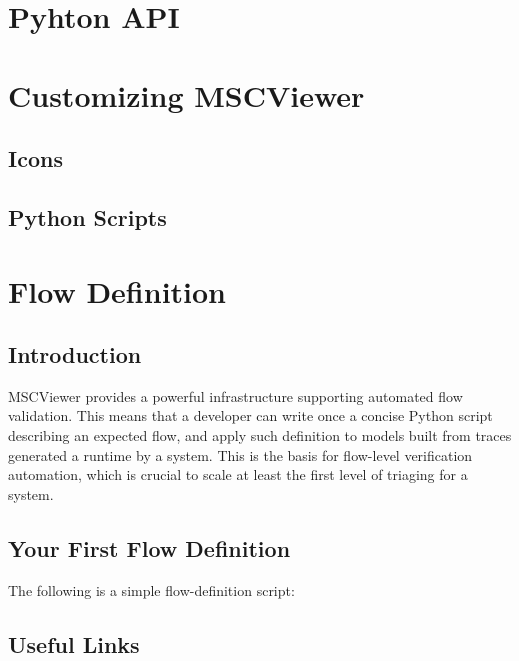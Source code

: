 \documentclass[11pt, twoside, titlepage]{book}
\newcommand{\prog}{MSCViewer}
\begin{document}
\chapter{Pyhton API}



\chapter{Customizing \prog}
\section{Icons}
\section{Python Scripts}

\chapter{Flow Definition}
\section{Introduction}
\prog{} provides a powerful infrastructure supporting automated flow validation.
This means that a developer can write once a concise Python script describing an expected flow,
and apply such definition to models built from traces generated a runtime by a system. This
is the basis for flow-level verification automation, which is crucial to scale at least the first
level of triaging for a system.

\section{Your First Flow Definition}
The following is a simple flow-definition script:


\appendix
\section{Useful Links}
\begin{tabular}{l l p{9.0cm}}

\end{tabular}
 
\printindex
\end{document}
